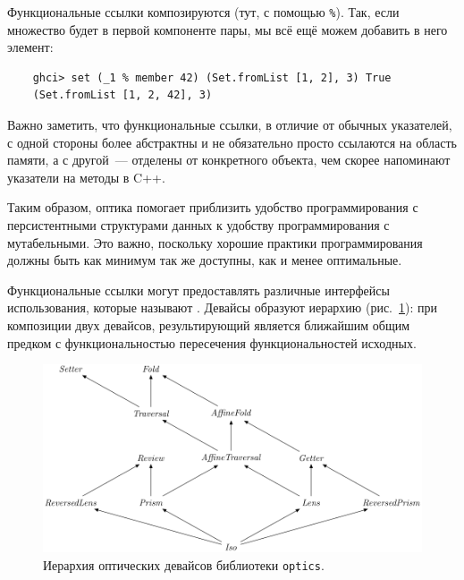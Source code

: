 Функциональные ссылки композируются (тут, с помощью \texttt{\%}).
Так, если множество будет в первой компоненте пары, мы всё ещё можем добавить в него элемент:
\begin{verbatim}
    ghci> set (_1 % member 42) (Set.fromList [1, 2], 3) True
    (Set.fromList [1, 2, 42], 3)
\end{verbatim}

Важно заметить, что функциональные ссылки, в отличие от обычных указателей, с одной стороны более абстрактны и не обязательно просто ссылаются на область памяти, а с другой~--- отделены от конкретного объекта, чем скорее напоминают указатели на методы в C++.

Таким образом, оптика помогает приблизить удобство программирования с персистентными структурами данных к удобству программирования с мутабельными.
Это важно, поскольку хорошие практики программирования должны быть как минимум так же доступны, как и менее оптимальные.

Функциональные ссылки могут предоставлять различные интерфейсы использования, которые называют .
Девайсы образуют иерархию (рис.~\ref{fig:optics-hierarchy}): при композиции двух девайсов, результирующий является ближайшим общим предком с функциональностью пересечения функциональностей исходных.

\begin{figure}
    \centering
    \includegraphics[width=\textwidth]{figs/optics-hierarchy}
    \caption{Иерархия оптических девайсов библиотеки \texttt{optics}.}
    \label{fig:optics-hierarchy}
\end{figure}

